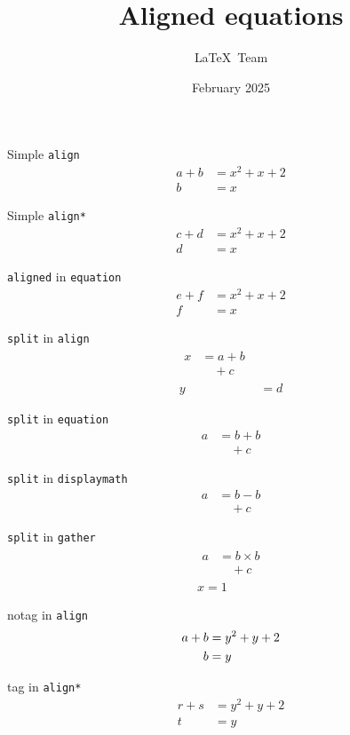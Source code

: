 \documentclass[a4paper]{article}
\title{Aligned equations}
\author{\LaTeX\ Team}
\date{February 2025}
\begin{document}
\maketitle



Simple \texttt{align}
\begin{align}
  a+b&=x^2+x+2\\
    b&=x
\end{align}



Simple \texttt{align*}
\begin{align*}
  c+d&=x^2+x+2\\
    d&=x
\end{align*}


\texttt{aligned} in \texttt{equation}
\begin{equation}
\begin{aligned}
  e+f&=x^2+x+2\\
    f&=x
\end{aligned}
\end{equation}

\texttt{split} in \texttt{align}
\begin{align}
\begin{split}
  x&= a  +  b\\
   &\quad + c
\end{split}\\
  y&=d
\end{align}

\texttt{split} in \texttt{equation}
\begin{equation}
\begin{split}
 a & = b+b\\
   &\quad + c
\end{split} 
\end{equation}

\texttt{split} in \texttt{displaymath}
\[
\begin{split}
 a & = b-b\\
   &\quad + c
\end{split} 
\]

\texttt{split} in \texttt{gather} 
\begin{gather}
\begin{split}
 a & = b\times b\\
   &\quad + c
\end{split}\\
x=1
\end{gather}


notag in  \texttt{align}
\begin{align}
  a+b&=y^2+y+2\notag\\
    b&=y
\end{align}


tag in  \texttt{align*}
\begin{align*}
  r+s&=y^2+y+2\\
    t&=y\tag{\dagger}
\end{align*}
\end{document}
